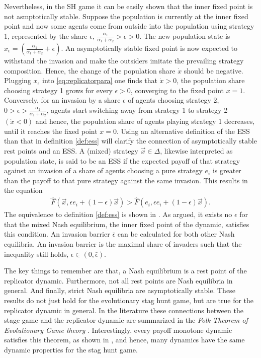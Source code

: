 Nevertheless, in the SH game it can be easily shown that the inner
fixed point is not asmptotically stable.
Suppose the population is currently at the inner fixed point and now 
some agents come from outside into the population
using strategy 1, represented by the share $\epsilon$,
$\frac{\alpha_1}{\alpha_1+\alpha_2}>\epsilon > 0$.
The new population state is 
$x_{\epsilon}=\left(\frac{\alpha_1}{\alpha_1+\alpha_2} + \epsilon\right)$.
An asymptotically stable fixed point is now expected to withstand the invasion
and make the outsiders imitate the prevailing strategy composition. Hence, 
the change of the population share $\dot{x}$ should be negative.
Plugging $x_{\epsilon}$ into
\eqref{eq:replicatorpara} one finds that $\dot{x} >0$, the population share
choosing strategy 1 grows for every $\epsilon >0$, converging to the 
fixed point $x = 1$. Conversely, for an invasion by a share $\epsilon$ 
of agents
choosing strategy 2, $0 > \epsilon > \frac{\alpha_2}{\alpha_1+\alpha_2}$,
agents start switching away from strategy 1 to strategy 2 $(\dot{x} < 0)$ 
and hence, the population share of agents playing strategy 1 
decreases, until it reaches the 
fixed point $x=0$. 
Using an alternative definition of the ESS than that in definition 
\ref{def:ess} will clarify the connection of asymptotically stable rest 
points and an ESS.
A (mixed) strategy $\vec{x} \in \Delta$, likewise 
interpreted as population state, is said to be an ESS if the 
expected payoff of that strategy against an invasion of a share of agents
choosing a pure strategy $e_i$ is greater than the payoff to that
pure strategy against the same invasion.
This results in the equation 
\begin{align*}
\hat{F}(\vec{x},\epsilon e_i + (1-\epsilon) \vec{x}) >
\hat{F}(e_i,\epsilon e_i + (1-\epsilon) \vec{x}).
\end{align*}
The equivalence to definition \eqref{def:ess} is shown in 
\textcite[37]{weibull_evolutionary_1997}.
As argued, it exists no $\epsilon$ for that the mixed Nash equilibrium, 
the inner fixed point of the dynamic, satisfies this condition. 
An invasion barrier $\bar{\epsilon}$ can be calculated for both other
Nash equilibria.
An invasion barrier is the maximal share of invaders 
such that the inequality still holds, $\epsilon \in (0,\bar{\epsilon})$.

The key things to remember are that, a Nash equilibrium is a rest point of
the replicator dynamic. Furthermore, not all rest points are 
Nash equilibria in general. And finally, strict Nash equilibria 
are asymptotically stable. These results do not just hold for
the evolutionary stag hunt game, but are true for the replicator dynamic
in general. In the literature these connections between the stage game
and the replicator dynamic are summarized in the
\textit{Folk Theorem of Evolutionary Game theory} 
\parencite[25]{szabo_evolutionary_2007}. Interestingly, every payoff
monotone dynamic satisfies this theorem, as shown in 
\textcite{hofbauer_evolutionary_2003}, and hence, many dynamics have the same
dynamic properties for the stag hunt game. 

